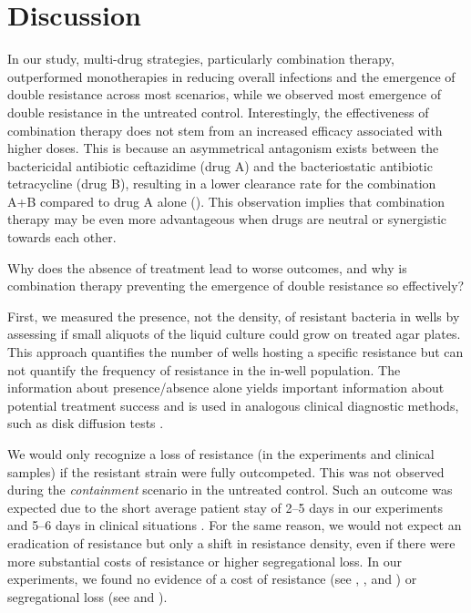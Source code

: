 \section{Discussion}
In our study, multi-drug strategies, particularly combination therapy, outperformed monotherapies in reducing overall infections and the emergence of double resistance across most scenarios, while we observed most emergence of double resistance in the untreated control.
Interestingly, the effectiveness of combination therapy does not stem from an increased efficacy associated with higher doses. 
This is because an asymmetrical antagonism exists between the bactericidal antibiotic ceftazidime (drug A) and the bacteriostatic antibiotic tetracycline (drug B), resulting in a lower clearance rate for the combination A+B compared to drug A alone (). 
This observation implies that combination therapy may be even more advantageous when drugs are neutral or synergistic towards each other.

Why does the absence of treatment lead to worse outcomes, and why is combination therapy preventing the emergence of double resistance so effectively?

First, we measured the presence, not the density, of resistant bacteria in wells by assessing if small aliquots of the liquid culture could grow on treated agar plates. 
This approach quantifies the number of wells hosting a specific resistance but can not quantify the frequency of resistance in the in-well population. 
The information about presence/absence alone yields important information about potential treatment success and is used in analogous clinical diagnostic methods, such as disk diffusion tests \cite{eucast_disk2024}.

We would only recognize a loss of resistance (in the experiments and clinical samples) if the resistant strain were fully outcompeted. 
This was not observed during the \textit{containment} scenario in the untreated control.
Such an outcome was expected due to the short average patient stay of 2--5 days in our experiments and 5--6 days in clinical situations \cite{BAG2015}.
For the same reason, we would not expect an eradication of resistance but only a shift in resistance density, even if there were more substantial costs of resistance or higher segregational loss.
In our experiments, we found no evidence of a cost of resistance (see , , and ) or segregational loss (see  and ).

